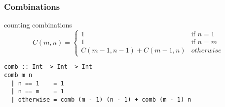 \documentclass[dvipsnames]{beamer}
\theoremstyle{plain}
\begin{document}
\begin{frame}[fragile]
  \frametitle{Combinations}

  \begin{exampleblock}{counting combinations}
    \[
      C(m, n) =
        \begin{cases}
          1                       & \mbox{if } n = 1\\
          1                       & \mbox{if } n = m\\
          C(m-1, n-1) + C(m-1, n) & otherwise
        \end{cases}
    \]

    \begin{lstlisting}
comb :: Int -> Int -> Int
comb m n
  | n == 1    = 1
  | n == m    = 1
  | otherwise = comb (m - 1) (n - 1) + comb (m - 1) n
    \end{lstlisting}
  \end{exampleblock}
\end{frame}

%
%
%
%
%
% 
\end{document}
